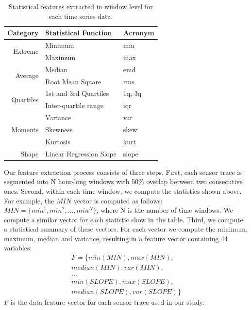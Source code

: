 \begin{table}[h]
\centering
\begin{tabular}{r|l|l}
\hline
Category                   & Statistical Function & \multicolumn{1}{l}{Acronym} \\ \hline\hline
\multirow{2}{*}{Extreme}   & Minimum                 & min                          \\ \cline{3-3} 
                           & Maximum                 & max                          \\ \hline
\multirow{2}{*}{Average}   & Median                  & emd                          \\ \cline{3-3} 
                           & Root Mean Square        & rms                          \\ \hline
\multirow{2}{*}{Quartiles} & 1st and 3rd Quartiles   & 1q, 3q                       \\ \cline{3-3} 
                           & Inter-quartile range    & iqr                          \\ \hline
\multirow{3}{*}{Moments}   & Variance                & var                          \\ \cline{3-3} 
                           & Skewness                & skew                         \\ \cline{3-3} 
                           & Kurtosis                & kurt                         \\ \hline
Shape                      & Linear Regression Slope & slope                        \\ \hline
\end{tabular}
\caption{Statistical features extracted in window level for each time series data.}
\label{table:fd}
\end{table}

Our feature extraction process consists of three steps.
First, each sensor trace is segmented into N hour-long windows with 50\% overlap between two consecutive ones. Second, within each time window, we compute the statistics shown above. 
For example, the $MIN$ vector is computed as follows: 
$MIN = \{min^{1}, min^{2}, ..., min^{N}\}$, where N is the number of time windows. We compute a similar vector for each statistic show in the table.
Third, we compute a statistical summary of these vectors. For each vector we compute the minimum, maximum, median and variance, resulting in a feature 
vector containing 44 variables:
\begin{displaymath}
\begin{split}
F = \{min(MIN), max(MIN), \\ 
median(MIN), var(MIN),\\
...\\
min(SLOPE), max(SLOPE), \\
median(SLOPE), var(SLOPE)\}
\end{split}
\end{displaymath}
$F$ is the data feature vector for each sensor trace used in our study.


